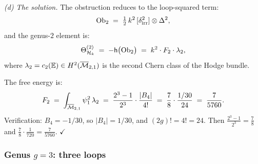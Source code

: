 \begin{computation}
\medskip\noindent\emph{(d) The solution.}
The obstruction reduces to the loop-squared term:
\begin{equation}%
\Ob_2
\;=\;
\tfrac{1}{2}\,k^2\,[\delta_{\mathrm{irr}}^2] \otimes
\Delta^2,
\end{equation}
and the genus-$2$ element is:
\begin{equation}%
\Theta^{(2)}_{\cH_k}
\;=\;
-\hCont\bigl(\Ob_2\bigr)
\;=\;
k^2 \cdot F_2 \cdot \lambda_2,
\end{equation}
where $\lambda_2 = c_2(\mathbb{E}) \in H^2(\overline{\mathcal{M}}_{2,1})$
is the second Chern class of the Hodge bundle.

The free energy is:
\begin{equation}%
F_2
\;=\;
\int_{\overline{\cM}_{2,1}} \psi_1^{2}\,\lambda_2
\;=\;
\frac{2^3 - 1}{2^3} \cdot \frac{|B_4|}{4!}
\;=\;
\frac{7}{8} \cdot \frac{1/30}{24}
\;=\;
\frac{7}{5760}.
\end{equation}
Verification: $B_4 = -1/30$, so $|B_4| = 1/30$, and
$(2g)! = 4! = 24$. Then
$\frac{2^3-1}{2^3} = \frac{7}{8}$ and
$\frac{7}{8} \cdot \frac{1}{720} = \frac{7}{5760}$. $\checkmark$
\end{computation}

\subsubsection{Genus $g = 3$: three loops}

